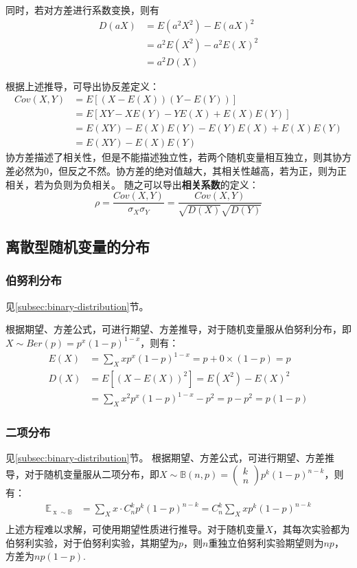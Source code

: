 \documentclass[12pt,a4paper]{article}
\begin{document}
  同时，若对方差进行系数变换，则有
  $$
  \begin{aligned}
    D(aX) &=E(a^2X^2)-E(aX)^2 \\ 
    &=a^2E(X^2)-a^2E(X)^2 \\ 
    &= a^2D(X)
  \end{aligned}
  $$

  根据上述推导，可导出协反差定义：
  $$
  \begin{aligned}
    C o v(X,Y) &= E[(X-E(X))(Y-E(Y))] \\ 
    &= E[XY-XE(Y)-YE(X)+E(X)E(Y)] \\ 
    &= E(XY) -E(X)E(Y) - E(Y)E(X)+E(X)E(Y) \\ 
    &= E(XY)-E(X)E(Y)
  \end{aligned}
  $$
  协方差描述了相关性，但是不能描述独立性，若两个随机变量相互独立，则其协方差必然为0，但反之不然。协方差的绝对值越大，其相关性越高，若为正，则为正相关，若为负则为负相关。
  随之可以导出\textbf{相关系数}的定义：
  $$
    \rho = \frac{Cov(X,Y)}{\sigma_X \sigma _Y} = \frac{Cov(X,Y)}{\sqrt{D(X)}\sqrt{D(Y)}}
  $$
  
  \subsection{离散型随机变量的分布}
  
  \subsubsection{伯努利分布}
  见\ref{subsec:binary-distribution}节。
  
  根据期望、方差公式，可进行期望、方差推导，对于随机变量服从伯努利分布，即$X\sim Ber(p)=p^x(1-p)^{1-x}$，则有：
  $$
  \begin{aligned}
    E(X) &= \sum \limits_X x p^x(1-p)^{1-x} = p + 0\times (1-p) = p\\ 
    D(X) & = E[(X-E(X))^2] = E(X^2)-E(X)^2 \\ 
    &= \sum \limits_X x^2p^x(1-p)^{1-x} - p^2 = p - p^2 = p(1-p)
  \end{aligned}
  $$
  
  \subsubsection{二项分布}
  见\ref{subsec:binary-distribution}节。
  根据期望、方差公式，可进行期望、方差推导，对于随机变量服从二项分布，即$X\sim \mathbb{B}(n, p) = \left(\begin{array}{c}
    k \\ 
    n
  \end{array}\right)p^k(1-p)^{n-k}$，则有：
  $$
  \begin{aligned}
    \mathbb{E}_{\mathop{x}\sim \mathbb{B}} &= \sum \limits _X x \cdot C_n^k p^k(1-p)^{n-k} = C_n^k \sum \limits _X x p^k(1-p)^{n-k} \\ 
  \end{aligned}
  $$
  上述方程难以求解，可使用期望性质进行推导。对于随机变量$X$，其每次实验都为伯努利实验，对于伯努利实验，其期望为$p$，则$n$重独立伯努利实验期望则为$np$，方差为$np(1-p)$.
\end{document}
